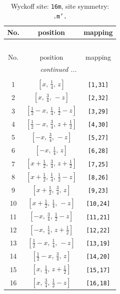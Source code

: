 \documentclass[fleqn,8pt]{jsarticle}
\begin{document}
\renewcommand{\arraystretch}{1.2}
\begin{longtable}{ccc}
\caption{Wyckoff site: {\tt 16m}, site symmetry: {\tt .m'.}}
 \\
 \hline \hline
No. & position & mapping \\ \hline \endfirsthead

\multicolumn{2}{l}{\tablename\ \thetable{}} \\
 \hline \hline
No. & position & mapping \\ \hline \endhead

 \hline \hline
\multicolumn{2}{r}{\footnotesize\it continued ...} \\ \endfoot

 \hline \hline
\multicolumn{2}{r}{} \\ \endlastfoot

1 & $\left[ x,\, \frac{1}{4},\, z \right]$ & {\tt [1,31]} \\ \hline
2 & $\left[ x,\, \frac{3}{4},\, - z \right]$ & {\tt [2,32]} \\ \hline
3 & $\left[ \frac{1}{2} - x,\, \frac{1}{4},\, \frac{1}{2} - z \right]$ & {\tt [3,29]} \\ \hline
4 & $\left[ \frac{1}{2} - x,\, \frac{3}{4},\, z + \frac{1}{2} \right]$ & {\tt [4,30]} \\ \hline
5 & $\left[ - x,\, \frac{3}{4},\, - z \right]$ & {\tt [5,27]} \\ \hline
6 & $\left[ - x,\, \frac{1}{4},\, z \right]$ & {\tt [6,28]} \\ \hline
7 & $\left[ x + \frac{1}{2},\, \frac{3}{4},\, z + \frac{1}{2} \right]$ & {\tt [7,25]} \\ \hline
8 & $\left[ x + \frac{1}{2},\, \frac{1}{4},\, \frac{1}{2} - z \right]$ & {\tt [8,26]} \\ \hline
9 & $\left[ x + \frac{1}{2},\, \frac{3}{4},\, z \right]$ & {\tt [9,23]} \\ \hline
10 & $\left[ x + \frac{1}{2},\, \frac{1}{4},\, - z \right]$ & {\tt [10,24]} \\ \hline
11 & $\left[ - x,\, \frac{3}{4},\, \frac{1}{2} - z \right]$ & {\tt [11,21]} \\ \hline
12 & $\left[ - x,\, \frac{1}{4},\, z + \frac{1}{2} \right]$ & {\tt [12,22]} \\ \hline
13 & $\left[ \frac{1}{2} - x,\, \frac{1}{4},\, - z \right]$ & {\tt [13,19]} \\ \hline
14 & $\left[ \frac{1}{2} - x,\, \frac{3}{4},\, z \right]$ & {\tt [14,20]} \\ \hline
15 & $\left[ x,\, \frac{1}{4},\, z + \frac{1}{2} \right]$ & {\tt [15,17]} \\ \hline
16 & $\left[ x,\, \frac{3}{4},\, \frac{1}{2} - z \right]$ & {\tt [16,18]} \\
\end{longtable}
\end{document}
